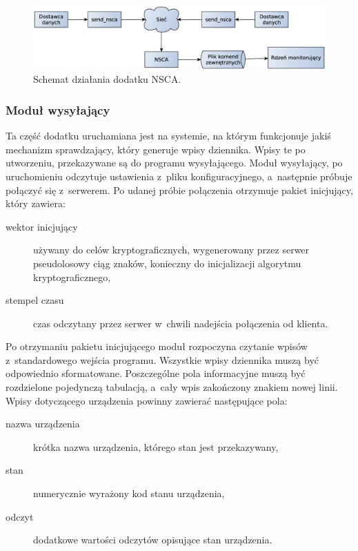 \begin{figure}[ht]
  \caption{Schemat działania dodatku NSCA.}
  \label{fig:nsca}
\includegraphics[width=1\textwidth]{img/nsca}
\end{figure}


\subsubsection[Moduł wysyłający][Moduł wysyłający]{Moduł wysyłający}
\label{subsubsec:modulWysylajacy}

Ta część dodatku uruchamiana jest na systemie, na którym funkcjonuje
jakiś mechanizm sprawdzający, który generuje wpisy dziennika. Wpisy te
po utworzeniu, przekazywane są do programu wysyłającego. Moduł
wysyłający, po uruchomieniu odczytuje ustawienia z~pliku
konfiguracyjnego, a~następnie próbuje połączyć się z~serwerem. Po
udanej próbie połączenia otrzymuje pakiet inicjujący, który zawiera:

\begin{description}
\item[wektor inicjujący] używany do celów kryptograficznych,
  wygenerowany przez serwer pseudolosowy ciąg znaków, konieczny do
  inicjalizacji algorytmu kryptograficznego,
\item[stempel czasu] czas odczytany przez serwer w~chwili nadejścia
  połączenia od klienta.
\end{description} 

Po otrzymaniu pakietu inicjującego moduł rozpoczyna czytanie wpisów
z~standardowego wejścia programu. Wszystkie wpisy dziennika muszą być
odpowiednio sformatowane. Poszczególne pola informacyjne muszą być
rozdzielone pojedynczą tabulacją, a~cały wpis zakończony znakiem
nowej linii. Wpisy dotyczącego urządzenia powinny zawierać następujące
pola:

\begin{description}
\item[nazwa urządzenia] krótka nazwa urządzenia, którego stan jest
  przekazywany,
\item[stan] numerycznie wyrażony kod stanu urządzenia,
\item[odczyt] dodatkowe wartości odczytów opisujące stan urządzenia.
\end{description}

